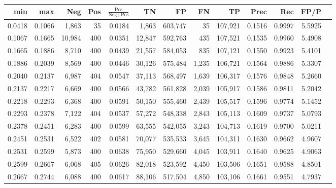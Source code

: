 \begin{tabular}{rrrrrrrrrrrrr}
\toprule
   min &    max &    Neg & Pos & $\frac{\text{Pos}}{\text{Neg}+\text{Pos}}$ &      TN &      FP &      FN &      TP &   Prec &    Rec &   FP/P \\
\midrule
0.0418 & 0.1066 &  1,863 &  35 &                                     0.0184 &   1,863 & 603,747 &      35 & 107,921 & 0.1516 & 0.9997 & 5.5925 \\
0.1067 & 0.1665 & 10,984 & 400 &                                     0.0351 &  12,847 & 592,763 &     435 & 107,521 & 0.1535 & 0.9960 & 5.4908 \\
0.1665 & 0.1886 &  8,710 & 400 &                                     0.0439 &  21,557 & 584,053 &     835 & 107,121 & 0.1550 & 0.9923 & 5.4101 \\
0.1886 & 0.2039 &  8,569 & 400 &                                     0.0446 &  30,126 & 575,484 &   1,235 & 106,721 & 0.1564 & 0.9886 & 5.3307 \\
0.2040 & 0.2137 &  6,987 & 404 &                                     0.0547 &  37,113 & 568,497 &   1,639 & 106,317 & 0.1576 & 0.9848 & 5.2660 \\
0.2137 & 0.2217 &  6,669 & 400 &                                     0.0566 &  43,782 & 561,828 &   2,039 & 105,917 & 0.1586 & 0.9811 & 5.2042 \\
0.2218 & 0.2293 &  6,368 & 400 &                                     0.0591 &  50,150 & 555,460 &   2,439 & 105,517 & 0.1596 & 0.9774 & 5.1452 \\
0.2293 & 0.2378 &  7,122 & 404 &                                     0.0537 &  57,272 & 548,338 &   2,843 & 105,113 & 0.1609 & 0.9737 & 5.0793 \\
0.2378 & 0.2451 &  6,283 & 400 &                                     0.0599 &  63,555 & 542,055 &   3,243 & 104,713 & 0.1619 & 0.9700 & 5.0211 \\
0.2451 & 0.2531 &  6,522 & 402 &                                     0.0581 &  70,077 & 535,533 &   3,645 & 104,311 & 0.1630 & 0.9662 & 4.9607 \\
0.2531 & 0.2599 &  5,873 & 400 &                                     0.0638 &  75,950 & 529,660 &   4,045 & 103,911 & 0.1640 & 0.9625 & 4.9063 \\
0.2599 & 0.2667 &  6,068 & 405 &                                     0.0626 &  82,018 & 523,592 &   4,450 & 103,506 & 0.1651 & 0.9588 & 4.8501 \\
0.2667 & 0.2744 &  6,088 & 400 &                                     0.0617 &  88,106 & 517,504 &   4,850 & 103,106 & 0.1661 & 0.9551 & 4.7937 \\

\end{tabular}
